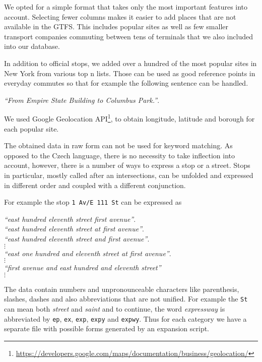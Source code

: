 We opted for a simple format that takes only the most important features into account.
Selecting fewer columns makes it easier to add places that are not available in the GTFS.
This includes popular sites as well as few smaller transport companies commuting between tens of terminals that we also included into our database.

In addition to official stops, we added over a hundred of the most popular sites in New York from various top n lists.
Those can be used as good reference points in everyday commutes so that for example the following sentence can be handled.

\begin{flushleft}
\textit{``From Empire State Building to Columbus Park.''}.
\end{flushleft}

\noindent We used Google Geolocation API\footnote{\url{https://developers.google.com/maps/documentation/business/geolocation/}}, to obtain longitude, latitude and borough for each popular site.

The obtained data in raw form can not be used for keyword matching. As opposed to the Czech language, there is no necessity to take inflection into account, however, there is a number of ways to express a stop or a street.
Stops in particular, mostly called after an intersections, can be unfolded and expressed in different order and coupled with a different conjunction.

For example the stop \texttt{1 Av/E 111 St} can be expressed as
\begin{flushleft}
\textit{``east hundred eleventh street first avenue''}. \\
\textit{``east hundred eleventh street at first avenue''}. \\
\textit{``east hundred eleventh street and first avenue''}. \\
\hspace{8em} $\vdots$ \\
\textit{``east one hundred and eleventh street at first avenue''}. \\
\hspace{8em} $\vdots$ \\
\textit{``first avenue and east hundred and eleventh street''} \\
\hspace{8em} $\vdots$
\end{flushleft}

The data contain numbers and unpronounceable characters like parenthesis, slashes, dashes and also abbreviations that are not unified.
For example the \texttt{St} can mean both \textit{street} and \textit{saint} and to continue, the word \textit{expressway} is abbreviated by \texttt{ep}, \texttt{ex}, \texttt{exp}, \texttt{expy} and \texttt{expwy}.
Thus for each category we have a separate file with possible forms generated by an expansion script.

